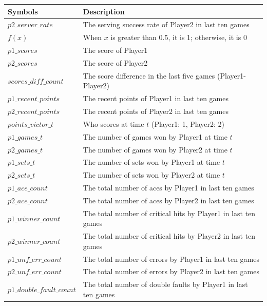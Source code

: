 \documentclass[UTF8]{ctexart} %
\begin{document}
\begin{table}[H] %
    \ContinuedFloat
    \begin{tabularx}{\textwidth}{XX}
    \toprule
    \textbf{Symbols} & \textbf{Description}\\
    \midrule
        $p2\_server\_rate$ & The serving success rate of Player2 in last ten games \\
        $f(x)$ & When \(x\) is greater than 0.5, it is 1; otherwise, it is 0 \\
        $p1\_scores$ & The score of Player1 \\
        $p2\_scores$ & The score of Player2 \\
        $scores\_diff\_count$ & The score difference in the last five games (Player1-Player2) \\
        $p1\_recent\_points$ & The recent points of Player1 in last ten games \\
        $p2\_recent\_points$ & The recent points of Player2 in last ten games \\
        $points\_victor\_t$ & Who scores at time \(t\) (Player1: 1, Player2: 2) \\
        $p1\_games\_t$ & The number of games won by Player1 at time \(t\) \\
        $p2\_games\_t$ & The number of games won by Player2 at time \(t\) \\
        $p1\_sets\_t$ & The number of sets won by Player1 at time \(t\) \\
        $p2\_sets\_t$ & The number of sets won by Player2 at time \(t\) \\
        $p1\_ace\_count$ & The total number of aces by Player1 in last ten games \\
        $p2\_ace\_count$ & The total number of aces by Player2 in last ten games \\
        $p1\_winner\_count$ & The total number of critical hits by Player1 in last ten games \\
        $p2\_winner\_count$ & The total number of critical hits by Player2 in last ten games \\
        $p1\_unf\_err\_count$ & The total number of errors by Player1 in last ten games \\
        $p2\_unf\_err\_count$ & The total number of errors by Player2 in last ten games \\
        $p1\_double\_fault\_count$ & The total number of double faults by Player1 in last ten games \\

\end{tabularx}
\end{table}
\end{document}
